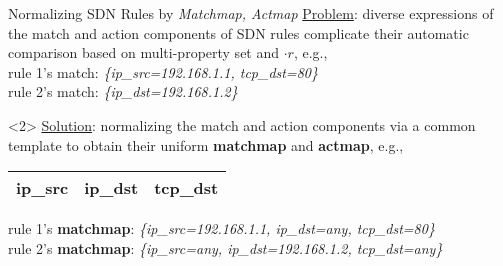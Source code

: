 \begin{frame}{Normalizing SDN Rules by \emph{Matchmap, Actmap}}
\underline{Problem}: diverse expressions of the match and action components of SDN rules complicate their automatic comparison based on multi-property set and $\cdot r$, e.g.,\\[4pt]
rule 1's match: \textit{\{\colorbox{yellow!20}{ip\_src=192.168.1.1}, \colorbox{blue!20}{tcp\_dst=80}\}}\\[4pt]
rule 2's match: \textit{\{\colorbox{pink!20}{ip\_dst=192.168.1.2}\}} \\[8pt]

\begin{onlyenv}<2>
\underline{Solution}: normalizing the match and action components via a common template to obtain their uniform \textbf{matchmap} and \textbf{actmap}, e.g.,\\[4pt]

\begin{center}
\begin{tabular}{|c|c|c|}
\hline
\cellcolor{yellow!20}ip\_src & \cellcolor{pink!20}ip\_dst & \cellcolor{blue!20}tcp\_dst\\
\hline
\end{tabular}
\end{center}

rule 1's \textbf{matchmap}: \textit{\{\colorbox{yellow!20}{ip\_src=192.168.1.1},     \colorbox{pink!20}{ip\_dst=any},\hspace{7ex} \colorbox{blue!20}{tcp\_dst=80}\}}\\[4pt]
rule 2's \textbf{matchmap}: \textit{\{\colorbox{yellow!20}{ip\_src=any}, \hspace{7ex}\colorbox{pink!20}{ip\_dst=192.168.1.2},     \colorbox{blue!20}{tcp\_dst=any}\}}
\end{onlyenv}

\end{frame}


